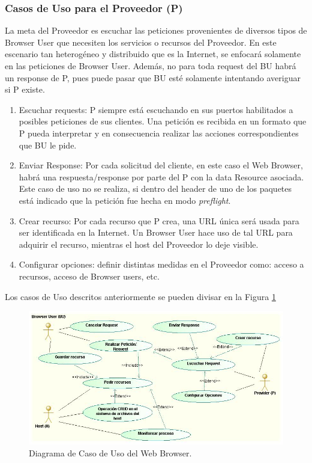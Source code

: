 		\subsubsection{Casos de Uso para el Proveedor (P)}
		La meta del Proveedor es escuchar las peticiones provenientes de diversos tipos de Browser User que necesiten los servicios o recursos del Proveedor. En este escenario tan heterogéneo y distribuido que es la Internet, se enfocará solamente en las peticiones de Browser User. Además, no para toda request del BU habrá un response de P, pues puede pasar que BU esté solamente intentando averiguar si P existe.
			\begin{enumerate}
				\item Escuchar requests: P siempre está escuchando en sus puertos habilitados a posibles peticiones de sus clientes. Una petición es recibida en un formato que P pueda interpretar y en consecuencia realizar las acciones correspondientes que BU le pide. 
				\item Enviar Response: Por cada solicitud del cliente, en este caso el Web Browser, habrá una respuesta/response por parte del P con la data Resource asociada. Este caso de uso no se realiza, si dentro del header de uno de los paquetes está indicado que la petición fue hecha en modo \textit{preflight}.
				\item Crear recurso: Por cada recurso que P crea, una URL única será usada para ser identificada en la Internet. Un Browser User hace uso de tal URL para adquirir el recurso, mientras el host del Proveedor lo deje visible.
				\item Configurar opciones: definir distintas medidas en el Proveedor como: acceso a recursos, acceso de Browser users, etc.
			\end{enumerate}

		Los casos de Uso descritos anteriormente se pueden divisar en la Figura \ref{fig:CUBrowser}

	    \begin{figure}[h!t]
	        \centering
	        \includegraphics[scale=0.45]{figures/chap4/UCBrowser.jpg}
	        \caption{Diagrama de Caso de Uso del Web Browser.}
	        \label{fig:CUBrowser}
	    \end{figure}


